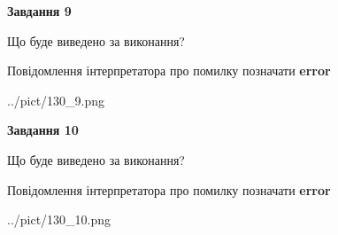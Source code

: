 \documentclass[12pt, ukrainian]{article}
\begin{document}
{{\begin {center}\textbf{Завдання 9}\end {center}}\par
Що буде виведено за виконання? \par
Повідомлення інтерпретатора про помилку позначати \textbf{error}

\begin{center}
	{../pict/130_9.png}
\end{center}
\newpage

{\begin {center}\textbf{Завдання 10}\end {center}}\par
Що буде виведено за виконання? \par
Повідомлення інтерпретатора про помилку позначати \textbf{error}

\begin{center}
	{../pict/130_10.png}
\end{center}
\newpage

}
\end{document}
